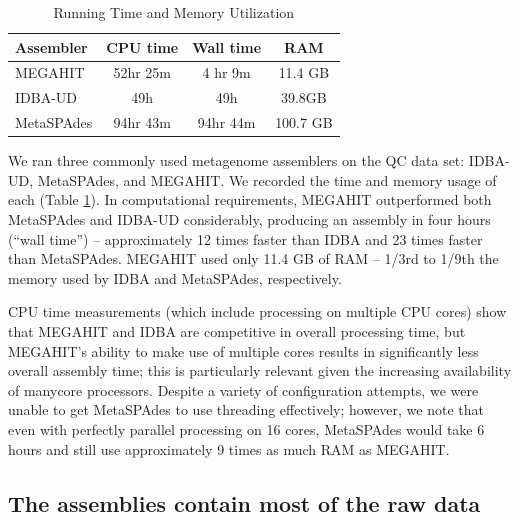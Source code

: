 \documentclass[11pt]{article}
\begin{document}
 \begin{table}[h]
\caption{Running Time and Memory Utilization}
\centering
\begin{tabular}{|l|c|c|c|}
\hline
\textbf{Assembler} & \textbf{CPU time} & \textbf{Wall time} & \textbf{RAM} \\ [0.5ex]
\hline
MEGAHIT & 52hr 25m & 4 hr 9m & 11.4 GB \\
\hline
IDBA-UD & 49h & 49h & 39.8GB \\
\hline
MetaSPAdes & 94hr 43m & 94hr 44m & 100.7 GB \\
\hline

\end{tabular}
\label{table:time-memory}
\end{table}

We ran three commonly used metagenome assemblers on the QC data set:
IDBA-UD, MetaSPAdes, and MEGAHIT. We recorded the time and memory
usage of each (Table \ref{table:time-memory}).  In computational
requirements, MEGAHIT outperformed both MetaSPAdes and IDBA-UD
considerably, producing an assembly in four hours (``wall time'') --
approximately 12 times faster than IDBA and 23 times faster than
MetaSPAdes.  MEGAHIT used only 11.4 GB of RAM -- 1/3rd to 1/9th the
memory used by IDBA and MetaSPAdes, respectively.

CPU time measurements (which include processing on multiple CPU cores)
show that MEGAHIT and IDBA are competitive in overall processing time,
but MEGAHIT's ability to make use of multiple cores results in
significantly less overall assembly time; this is particularly
relevant given the increasing availability of manycore processors.  Despite a
variety of configuration attempts, we were unable to get MetaSPAdes to
use threading effectively; however, we note that even with perfectly
parallel processing on 16 cores, MetaSPAdes would take 6 hours and
still use approximately 9 times as much RAM as MEGAHIT.


\subsection*{The assemblies contain most of the raw data}



\end{document}
